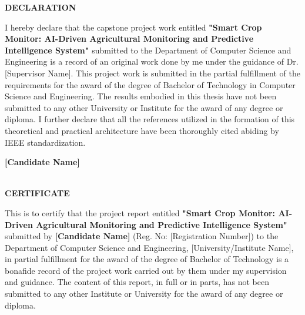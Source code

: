 \documentclass[12pt, a4paper]{report}
\begin{document}
\newpage
\thispagestyle{empty}
\vspace*{2cm}
\begin{center}
    \Large \textbf{DECLARATION}
\end{center}
\vspace{1cm}
I hereby declare that the capstone project work entitled \textbf{"Smart Crop Monitor: AI-Driven Agricultural Monitoring and Predictive Intelligence System"} submitted to the Department of Computer Science and Engineering is a record of an original work done by me under the guidance of Dr. [Supervisor Name]. This project work is submitted in the partial fulfillment of the requirements for the award of the degree of Bachelor of Technology in Computer Science and Engineering. The results embodied in this thesis have not been submitted to any other University or Institute for the award of any degree or diploma. I further declare that all the references utilized in the formation of this theoretical and practical architecture have been thoroughly cited abiding by IEEE standardization.

\vspace{3cm}

\begin{flushright}
    \textbf{[Candidate Name]} \\
    [Registration Number] \\
    [Date]
\end{flushright}

\newpage
\thispagestyle{empty}
\vspace*{2cm}
\begin{center}
    \Large \textbf{CERTIFICATE}
\end{center}
\vspace{1cm}
This is to certify that the project report entitled \textbf{"Smart Crop Monitor: AI-Driven Agricultural Monitoring and Predictive Intelligence System"} submitted by \textbf{[Candidate Name]} (Reg. No: [Registration Number]) to the Department of Computer Science and Engineering, [University/Institute Name], in partial fulfillment for the award of the degree of Bachelor of Technology is a bonafide record of the project work carried out by them under my supervision and guidance. The content of this report, in full or in parts, has not been submitted to any other Institute or University for the award of any degree or diploma.
\end{document}
